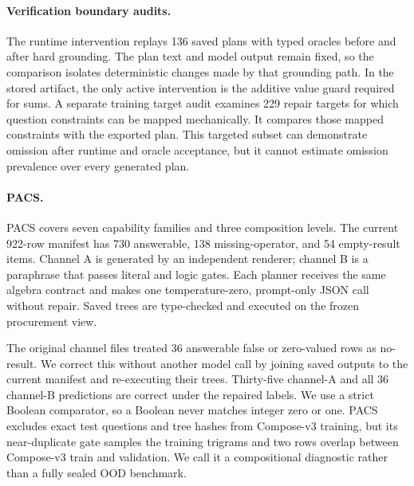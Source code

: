 \paragraph{Verification boundary audits.}
The runtime intervention replays 136 saved plans with typed oracles before and after hard
grounding.  The plan text and model output remain fixed, so the comparison isolates deterministic
changes made by that grounding path.  In the stored artifact, the only active intervention is the
additive value guard required for sums.  A separate training target audit examines 229 repair
targets for which question constraints can be mapped mechanically.  It compares those mapped
constraints with the exported plan.  This targeted subset can demonstrate omission after runtime
and oracle acceptance, but it cannot estimate omission prevalence over every generated plan.

\paragraph{PACS.}
PACS covers seven capability families and three composition levels.  The current 922-row manifest
has 730 answerable, 138 missing-operator, and 54 empty-result items.  Channel A is generated by an
independent renderer; channel B is a paraphrase that passes literal and logic gates.  Each planner
receives the same algebra contract and makes one temperature-zero, prompt-only JSON call without
repair.  Saved trees are type-checked and executed on the frozen procurement view.

The original channel files treated 36 answerable false or zero-valued rows as no-result.  We correct this
without another model call by joining saved outputs to the current manifest and re-executing their
trees.  Thirty-five channel-A and all 36 channel-B predictions are correct under the repaired
labels.  We use a strict Boolean comparator, so a Boolean never matches integer zero or one.  PACS
excludes exact test questions and tree hashes from Compose-v3 training, but its near-duplicate gate
samples the training trigrams and two rows overlap between Compose-v3 train and validation.  We call
it a compositional diagnostic rather than a fully sealed OOD benchmark.

